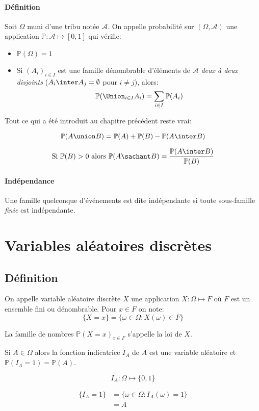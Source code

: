 \documentclass[a4paper,10pt,french,openany]{memoir}
\newcommand{\Proba}{\mathbb{P}}
\newcommand{\tribu}[1]{\mathcal{#1}}
\begin{document}
\paragraph{Définition}
Soit $\Omega$ muni d'une tribu notée $\tribu A$.
On appelle probabilité sur $(\Omega, \tribu A)$ une application 
\( \Proba: \tribu A \mapsto [0, 1] \)
qui vérifie:
\begin{itemize}
 \item $\Proba(\Omega) = 1$
 \item Si $(A_i)_{i \in I}$ est une famille dénombrable d'éléments de $\tribu A$ \emph{deux à deux disjoints} ($A_i \inter A_j = \emptyset$ pour $i \neq j$), alors:
 \[ \Proba(\Union_{i\in I} A_i) = \sum_{i\in I} \Proba(A_i) \]
\end{itemize}

Tout ce qui a été introduit au chapitre précédent reste vrai:

\[ \Proba(A \union B) = \Proba(A) + \Proba(B) - \Proba(A \inter B) \]

\[ \text{Si } \Proba(B) > 0 \text{ alors } \Proba(A \sachant B) = \frac{\Proba(A \inter B)}{\Proba(B)} \]

\paragraph{Indépendance}
Une famille quelconque d'événements est dite indépendante si toute sous-famille \emph{finie} est indépendante.

\section{Variables aléatoires discrètes}

\subsection{Définition}
On appelle variable aléatoire discrète $X$ une application $X: \Omega \mapsto F$ où $F$ est un ensemble fini ou dénombrable. Pour $x \in F$ on note:
\[ \{X=x\} = \{\omega \in \Omega: X(\omega) \in F\} \]

La famille de nombres $\Proba(X=x)_{x \in F}$ s'appelle la loi de $X$.

Si $A \in \Omega$ alors la fonction indicatrice $I_A$ de $A$ est une variable aléatoire et $\Proba(I_A = 1) = \Proba(A)$.

\[I_A : \Omega \mapsto \{0,1\}\]

\begin{align*}
 \{I_A=1\} &= \{\omega \in \Omega: I_A(\omega)=1\}\\
           &= A
\end{align*}
\end{document}
